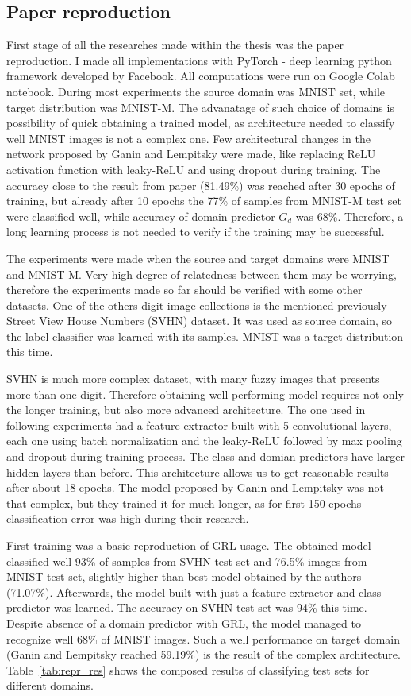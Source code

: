 \documentclass{article}
\begin{document}
\subsection{Paper reproduction}
First stage of all the researches made within the thesis was the paper reproduction. I made all implementations with PyTorch - deep learning python framework developed by Facebook. All computations were run on Google Colab notebook. During most experiments the source domain was MNIST set, while target distribution was MNIST-M. The advanatage of such choice of domains is possibility of quick obtaining a trained model, as architecture needed to classify well MNIST images is not a complex one. Few architectural changes in the network proposed by Ganin and Lempitsky were made, like replacing ReLU activation function with leaky-ReLU and using dropout during training. The accuracy close to the result from paper (81.49\%) was reached after 30 epochs of training, but already after 10 epochs the 77\% of samples from MNIST-M test set were classified well, while accuracy of domain predictor $G_{d}$ was 68\%. Therefore, a long learning process is not needed to verify if the training may be successful.
\par
The experiments were made when the source and target domains were MNIST and MNIST-M. Very high degree of relatedness between them may  be worrying, therefore the experiments made so far should be verified with some other datasets. One of the others digit image collections is the mentioned previously Street View House Numbers (SVHN) dataset. It was used as source domain, so the label classifier was learned with its samples. MNIST was a target distribution this time.
\par
SVHN is much more complex dataset, with many fuzzy images that presents more than one digit. Therefore obtaining well-performing model requires not only the longer training, but also more advanced architecture. The one used in following experiments had a feature extractor built with 5 convolutional layers, each one using batch normalization and the leaky-ReLU followed by max pooling and dropout during training process. The class and domian predictors have larger hidden layers than before. This architecture allows us to get reasonable results after about 18 epochs. The model proposed by Ganin and Lempitsky was not that complex, but they trained it for much longer, as for first 150 epochs classification error was high during their research.
\par
First training was a basic reproduction of GRL usage. The obtained model classified well 93\% of samples from SVHN test set and 76.5\% images from MNIST test set, slightly higher than best model obtained by the authors (71.07\%). Afterwards, the model built with just a feature extractor and class predictor was learned. The accuracy on SVHN test set was 94\% this time. Despite absence of a domain predictor with GRL, the model managed to recognize well 68\% of MNIST images. Such a well performance on target domain (Ganin and Lempitsky reached 59.19\%) is the result of the complex architecture. Table~\ref{tab:repr_res} shows the composed results of classifying test sets for different domains.
\end{document}
